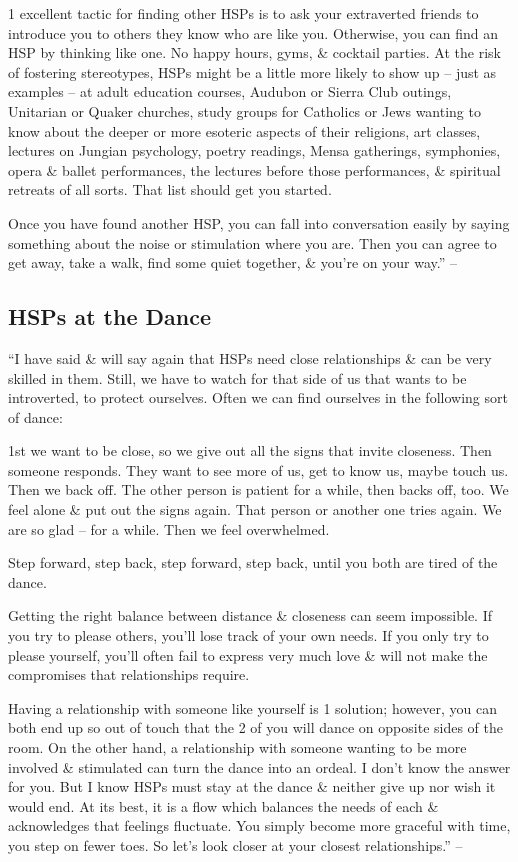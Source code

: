 \documentclass{article}
\numberwithin{equation}{section}
\begin{document}
1 excellent tactic for finding other HSPs is to ask your extraverted friends to introduce you to others they know who are like you. Otherwise, you can find an HSP by thinking like one. No happy hours, gyms, \& cocktail parties. At the risk of fostering stereotypes, HSPs might be a little more likely to show up -- just as examples -- at adult education courses, Audubon or Sierra Club outings, Unitarian or Quaker churches, study groups for Catholics or Jews wanting to know about the deeper or more esoteric aspects of their religions, art classes, lectures on Jungian psychology, poetry readings, Mensa gatherings, symphonies, opera \& ballet performances, the lectures before those performances, \& spiritual retreats of all sorts. That list should get you started.

Once you have found another HSP, you can fall into conversation easily by saying something about the noise or stimulation where you are. Then you can agree to get away, take a walk, find some quiet together, \& you're on your way.'' -- \cite[p. 180]{Aron2013}

\subsection{HSPs at the Dance}
``I have said \& will say again that HSPs need close relationships \& can be very skilled in them. Still, we have to watch for that side of us that wants to be introverted, to protect ourselves. Often we can find ourselves in the following sort of dance:

1st we want to be close, so we give out all the signs that invite closeness. Then someone responds. They want to see more of us, get to know us, maybe touch us. Then we back off. The other person is patient for a while, then backs off, too. We feel alone \& put out the signs again. That person or another one tries again. We are so glad -- for a while. Then we feel overwhelmed.

Step forward, step back, step forward, step back, until you both are tired of the dance.

Getting the right balance between distance \& closeness can seem impossible. If you try to please others, you'll lose track of your own needs. If you only try to please yourself, you'll often fail to express very much love \& will not make the compromises that relationships require.

Having a relationship with someone like yourself is 1 solution; however, you can both end up so out of touch that the 2 of you will dance on opposite sides of the room. On the other hand, a relationship with someone wanting to be more involved \& stimulated can turn the dance into an ordeal. I don't know the answer for you. But I know HSPs must stay at the dance \& neither give up nor wish it would end. At its best, it is a flow which balances the needs of each \& acknowledges that feelings fluctuate. You simply become more graceful with time, you step on fewer toes. So let's look closer at your closest relationships.'' -- \cite[p. 181]{Aron2013}
\end{document}
